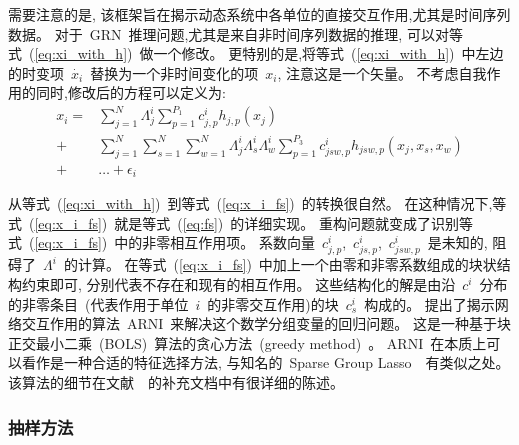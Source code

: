 需要注意的是, 该框架旨在揭示动态系统中各单位的直接交互作用,尤其是时间序列数据。
对于~GRN~推理问题,尤其是来自非时间序列数据的推理,
可以对等式~(\ref{eq:xi_with_h})~做一个修改。
更特别的是,将等式~(\ref{eq:xi_with_h})~中左边的时变项~$\dot{x_i}$~替换为一个非时间变化的项~$x_i$, 注意这是一个矢量。
不考虑自我作用的同时,修改后的方程可以定义为:
\begin{equation}
\label{eq:x_i_fs}
\begin{split}
   x_i = &\sum_{j=1}^{N} \Lambda^i_{j} \sum_{p=1}^{P_1} c^i_{j,p}h_{j,p}(x_j)\\  
       + &\sum_{j=1}^{N} \sum_{s=1}^{N} \sum_{w=1}^{N}\Lambda^i_{j}\Lambda^i_{s}\Lambda^i_{w} \sum_{p=1}^{P_3} c^i_{jsw,p}h_{jsw,p}(x_j,x_s,x_w)\\
       +&\ldots + \epsilon_{i}
   \end{split}
\end{equation}

从等式~(\ref{eq:xi_with_h})~到等式~(\ref{eq:x_i_fs})~的转换很自然。
在这种情况下,等式~(\ref{eq:x_i_fs})~就是等式~(\ref{eq:fs})~的详细实现。
重构问题就变成了识别等式~(\ref{eq:x_i_fs})~中的非零相互作用项。
系数向量~$c^i_{j,p}$,~$c^i_{js,p}$,~$c^i_{jsw,p}$~是未知的,
阻碍了~$\Lambda^i$~的计算。
在等式~(\ref{eq:x_i_fs})~中加上一个由零和非零系数组成的块状结构约束即可,
分别代表不存在和现有的相互作用。
这些结构化的解是由沿~$c^i$~分布的非零条目~(代表作用于单位~$i$~的非零交互作用)的块~$c^i_s$~构成的。
提出了揭示网络交互作用的算法~ARNI~来解决这个数学分组变量的回归问题。
这是一种基于块正交最小二乘~(BOLS)~算法的贪心方法~(greedy method)~\cite{majumdar2009fast}。
ARNI~在本质上可以看作是一种合适的特征选择方法,
与知名的~Sparse Group Lasso~\cite{friedman2010note}~有类似之处。
该算法的细节在文献~\cite{casadiego2017model}~的补充文档中有很详细的陈述。

\subsubsection{抽样方法}

